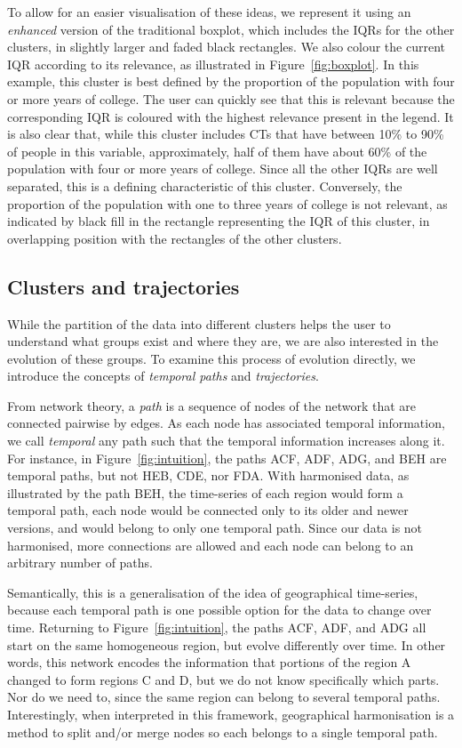 To allow for an easier visualisation of these ideas, we represent it using an
\emph{enhanced} version of the traditional boxplot, which includes the IQRs for
the other clusters, in slightly larger and faded black rectangles. We also
colour the current IQR according to its relevance, as illustrated in
Figure~\ref{fig:boxplot}. In this example, this cluster is best defined by the
proportion of the population with four or more years of college. The user can
quickly see that this is relevant because the corresponding IQR is coloured with
the highest relevance present in the legend. It is also clear that, while this
cluster includes CTs that have between 10\% to 90\% of people in this variable,
approximately, half of them have about 60\% of the population with four or more
years of college. Since all the other IQRs are well separated, this is a
defining characteristic of this cluster. Conversely, the proportion of the
population with one to three years of college is not relevant, as indicated by
black fill in the rectangle representing the IQR of this cluster, in overlapping
position with the rectangles of the other clusters.

\subsection{Clusters and trajectories}
While the partition of the data into different clusters helps the user to
understand what groups exist and where they are, we are also interested in the
evolution of these groups. To examine this process of evolution directly, we
introduce the concepts of \emph{temporal paths} and \emph{trajectories}. 

From network theory, a \emph{path} is a sequence of nodes of the network that
are connected pairwise by edges. As each node has associated temporal
information, we call \emph{temporal} any path such that the temporal information
increases along it. For instance, in Figure~\ref{fig:intuition}, the paths ACF,
ADF, ADG, and BEH are temporal paths, but not HEB, CDE, nor FDA. With harmonised
data, as illustrated by the path BEH, the time-series of each region would form
a temporal path, each node would be connected only to its older and newer
versions, and would belong to only one temporal path. Since our data is not
harmonised, more connections are allowed and each node can belong to an
arbitrary number of paths.

Semantically, this is a generalisation of the idea of geographical time-series,
because each temporal path is one possible option for the data to change over
time. Returning to Figure~\ref{fig:intuition}, the paths ACF, ADF, and ADG all
start on the same homogeneous region, but evolve differently over time. In other
words, this network encodes the information that portions of the region A
changed to form regions C and D, but we do not know specifically which parts.
Nor do we need to, since the same region can belong to several temporal paths.
Interestingly, when interpreted in this framework, geographical harmonisation is
a method to split and/or merge nodes so each belongs to a single temporal path.

